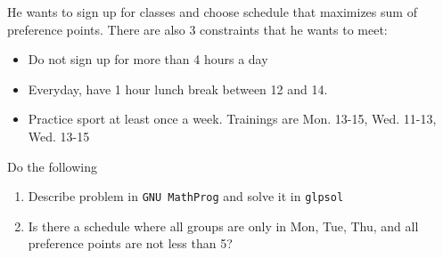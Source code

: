 He wants to sign up for classes and choose schedule that maximizes sum of preference points.
There are also 3 constraints that he wants to meet:
\begin{itemize}
    \item Do not sign up for more than 4 hours a day
    \item Everyday, have 1 hour lunch break between 12 and 14.
    \item Practice sport at least once a week. Trainings are Mon. 13-15, Wed. 11-13, Wed. 13-15
\end{itemize}

Do the following
\begin{enumerate}
    \item Describe problem in \texttt{GNU MathProg} and solve it in \texttt{glpsol} \notdone
    \item Is there a schedule where all groups are only in Mon, Tue, Thu, and all preference points are not less than 5? \notdone
\end{enumerate}
   